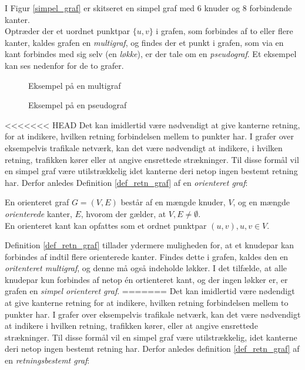 \begin{defn}
\noindent I Figur \ref{simpel_graf} er skitseret en simpel graf med $6$ knuder og $8$ forbindende kanter. \\ 

\noindent Optræder der et uordnet punktpar $\lbrace u,v \rbrace$ i grafen, som forbindes af to eller flere kanter, kaldes grafen en \textit{multigraf}, og findes der et punkt i grafen, som via en kant forbindes med sig selv (en \textit{løkke}), er der tale om en \textit{pseudograf}. Et eksempel kan ses nedenfor for de to grafer.

\begin{figure}[!htb]
   \begin{minipage}{0.48\textwidth}
     \centering
     
     \caption{Eksempel på en multigraf}\label{Fig:Data1}
   \end{minipage}\hfill
   \begin{minipage}{0.48\textwidth}
     \centering
     
     \caption{Eksempel på en pseudograf}\label{Fig:Data2}
   \end{minipage}
\end{figure}


<<<<<<< HEAD
\noindent Det kan imidlertid være nødvendigt at give kanterne retning, for at indikere, hvilken retning forbindelsen mellem to punkter har. I grafer over eksempelvis trafikale netværk, kan det være nødvendigt at indikere, i hvilken retning, trafikken kører eller at angive ensrettede strækninger. Til disse formål vil en simpel graf være utilstrækkelig idet kanterne deri netop ingen bestemt retning har. Derfor anledes Definition \ref{def_retn_graf} 
af en \textit{orienteret graf}:

\begin{defn}
En orienteret graf $G = (V, E)$ består af en mængde knuder, $V$, og en mængde \textit{orienterede} kanter, $E$, hvorom der gælder, at $V, E \neq \emptyset$.\\
En orienteret kant kan opfattes som et ordnet punktpar $(u,v), u,v \in  V$.
\label{def_retn_graf}
\end{defn} 

\noindent Definition \ref{def_retn_graf} tillader ydermere muligheden for, at et knudepar kan forbindes af indtil flere orienterede kanter. Findes dette i grafen, kaldes den en \textit{oritenteret multigraf}, og denne må også indeholde løkker. I det tilfælde, at alle knudepar kun forbindes af netop én ortienteret kant, og der ingen løkker er, er grafen en \textit{simpel orienteret graf}.
=======
\noindent Det kan imidlertid være nødendigt at give kanterne retning for at indikere, hvilken retning forbindelsen mellem to punkter har. I grafer over eksempelvis trafikale netværk, kan det være nødvendigt at indikere i hvilken retning, trafikken kører, eller at angive ensrettede strækninger. Til disse formål vil en simpel graf være utilstrækkelig, idet kanterne deri netop ingen bestemt retning har. Derfor anledes definition \ref{def_retn_graf} 
af en \textit{retningsbestemt graf}:


\end{defn}
